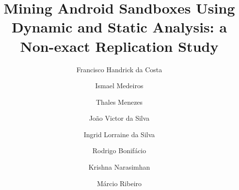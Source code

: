\documentclass[review]{elsarticle}
\begin{document}
\begin{frontmatter}
\title{Mining Android Sandboxes Using Dynamic and Static Analysis: a Non-exact Replication Study}


\author[1]{Francisco Handrick da Costa}
\author[1]{Ismael Medeiros}
\author[1]{Thales Menezes}
\author[1]{Jo\~{a}o Victor da Silva}
\author[1]{Ingrid Lorraine da Silva}
\author[1]{Rodrigo Bonif\'{a}cio}
\author[2]{Krishna Narasimhan}
\author[3]{M\'{a}rcio Ribeiro}

\address[1]{Computer Science Department, University of Bras\'{i}lia, Brazil}
\address[2]{Software Technology Group, TU Darmstadt, Germany}
\address[3]{Institute of Computing, Federal University of Alagoas, Brazil}




\end{frontmatter}












% 
\end{document}
